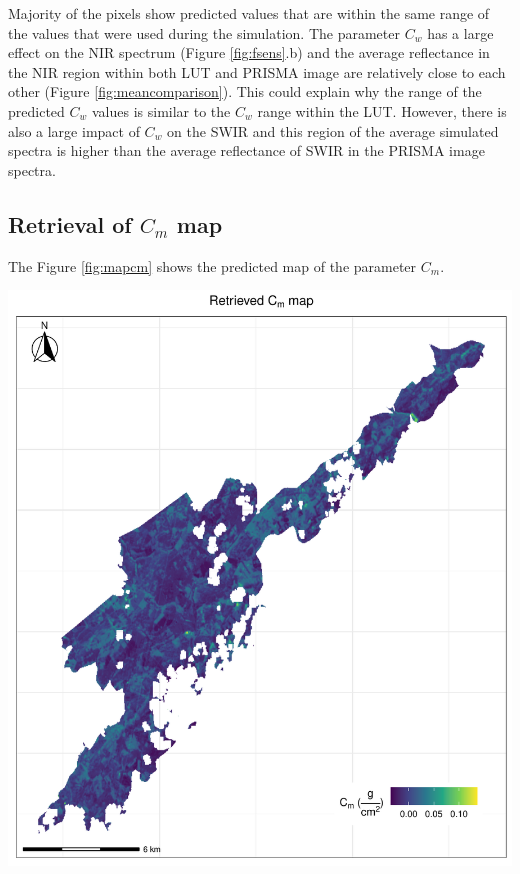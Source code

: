 \documentclass[a4paper, twoside]{templates/ociamthesis}
\let\origfigure\figure
\let\endorigfigure\endfigure
\renewenvironment{figure}[1][2] {
    \expandafter\origfigure\expandafter[H]
} {
    \endorigfigure
}
\begin{document}
Majority of the pixels show predicted values that are within the same range of the values that were used during the simulation. The parameter \(C_{w}\) has a large effect on the NIR spectrum (Figure \ref{fig:fsens}.b) and the average reflectance in the NIR region within both LUT and PRISMA image are relatively close to each other (Figure \ref{fig:meancomparison}). This could explain why the range of the predicted \(C_{w}\) values is similar to the \(C_{w}\) range within the LUT. However, there is also a large impact of \(C_{w}\) on the SWIR and this region of the average simulated spectra is higher than the average reflectance of SWIR in the PRISMA image spectra.

\hypertarget{retrieval-of-c_m-map}{%
\subsection{\texorpdfstring{Retrieval of \(C_{m}\) map}{Retrieval of C\_\{m\} map}}\label{retrieval-of-c_m-map}}

The Figure \ref{fig:mapcm} shows the predicted map of the parameter \(C_{m}\).

\begin{figure}
\includegraphics[width=0.9\linewidth]{./figures/cm_map} \caption{Predicted map of the parameter $C_{m}$}\label{fig:mapcm}
\end{figure}
\end{document}

